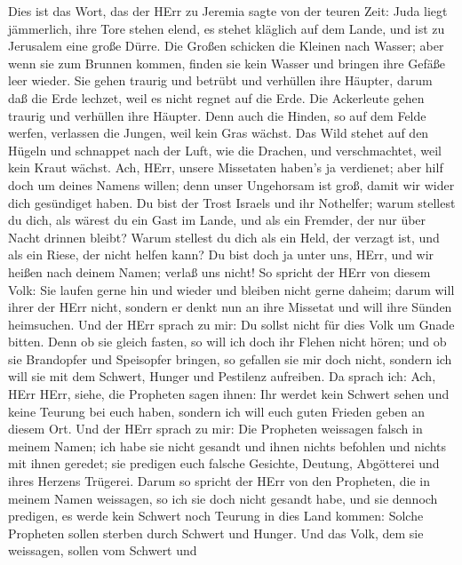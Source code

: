  Dies ist das Wort, das der HErr zu Jeremia sagte von der
teuren Zeit:  Juda liegt jämmerlich, ihre Tore stehen elend,
es stehet kläglich auf dem Lande, und ist zu Jerusalem eine große Dürre.
 Die Großen schicken die Kleinen nach Wasser; aber wenn sie
zum Brunnen kommen, finden sie kein Wasser und bringen ihre Gefäße leer
wieder. Sie gehen traurig und betrübt und verhüllen ihre Häupter,
 darum daß die Erde lechzet, weil es nicht regnet auf die
Erde. Die Ackerleute gehen traurig und verhüllen ihre Häupter.
 Denn auch die Hinden, so auf dem Felde werfen, verlassen
die Jungen, weil kein Gras wächst.  Das Wild stehet auf den
Hügeln und schnappet nach der Luft, wie die Drachen, und verschmachtet,
weil kein Kraut wächst.  Ach, HErr, unsere Missetaten
haben's ja verdienet; aber hilf doch um deines Namens willen; denn unser
Ungehorsam ist groß, damit wir wider dich gesündiget haben. 
Du bist der Trost Israels und ihr Nothelfer; warum stellest du dich, als
wärest du ein Gast im Lande, und als ein Fremder, der nur über Nacht
drinnen bleibt?  Warum stellest du dich als ein Held, der
verzagt ist, und als ein Riese, der nicht helfen kann? Du bist doch ja
unter uns, HErr, und wir heißen nach deinem Namen; verlaß uns nicht!
 So spricht der HErr von diesem Volk: Sie laufen gerne hin
und wieder und bleiben nicht gerne daheim; darum will ihrer der HErr
nicht, sondern er denkt nun an ihre Missetat und will ihre Sünden
heimsuchen.  Und der HErr sprach zu mir: Du sollst nicht
für dies Volk um Gnade bitten.  Denn ob sie gleich fasten,
so will ich doch ihr Flehen nicht hören; und ob sie Brandopfer und
Speisopfer bringen, so gefallen sie mir doch nicht, sondern ich will sie
mit dem Schwert, Hunger und Pestilenz aufreiben.  Da sprach
ich: Ach, HErr HErr, siehe, die Propheten sagen ihnen: Ihr werdet kein
Schwert sehen und keine Teurung bei euch haben, sondern ich will euch
guten Frieden geben an diesem Ort.  Und der HErr sprach zu
mir: Die Propheten weissagen falsch in meinem Namen; ich habe sie nicht
gesandt und ihnen nichts befohlen und nichts mit ihnen geredet; sie
predigen euch falsche Gesichte, Deutung, Abgötterei und ihres Herzens
Trügerei.  Darum so spricht der HErr von den Propheten, die
in meinem Namen weissagen, so ich sie doch nicht gesandt habe, und sie
dennoch predigen, es werde kein Schwert noch Teurung in dies Land
kommen: Solche Propheten sollen sterben durch Schwert und Hunger.
 Und das Volk, dem sie weissagen, sollen vom Schwert und
